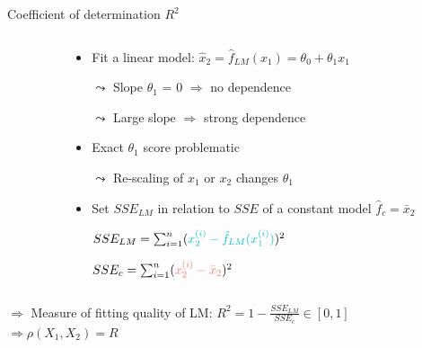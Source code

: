 \documentclass[10pt,compress,t,notes=noshow, xcolor=table]{beamer}
\begin{document}
\begin{frame}{Coefficient of determination $R^2$}
\begin{columns}[c, totalwidth=\textwidth]
\begin{column}{0.48\linewidth}
\end{column}
\begin{column}{0.52\linewidth}

\medskip

\begin{itemize}
    \setlength\itemsep{0.7mm}
    \item Fit a linear model:
    $\hat{x}_2 = \hat{f}_{LM}(x_1) = \theta_0 + \theta_1 x_1$
    \item[$\leadsto$] Slope $\theta_1$ = $0$ $\Rightarrow$ no dependence
    \item[$\leadsto$] Large slope $\Rightarrow$ strong dependence
        \pause
    \item Exact $\theta_1$ score problematic 
    \item[$\leadsto$] Re-scaling of $x_1$ or $x_2$ changes $\theta_1$ 
    \pause
    \item Set $SSE_{LM}$ in relation to $SSE$ of a constant model $\hat{f}_c = \bar{x}_2$
    \item[] $SSE_{LM} = \sum_{i=1}^n ({\color{ggblue}x_2^{(i)} - \hat{f}_{LM}(x_1^{(i)})})^2$
    \item[] $SSE_{c} = \sum_{i=1}^n ({\color{ggred}x_2^{(i)} - \bar{x}_2})^2$
\end{itemize}

\end{column}
\end{columns}

\medskip

$\Rightarrow$ Measure of fitting quality of LM: $R^2 = 1-\frac{SSE_{LM}}{SSE_{c}} \in [0, 1]$ \\
$\Rightarrow \rho(X_1, X_2) = R$

\end{frame}
\end{document}
